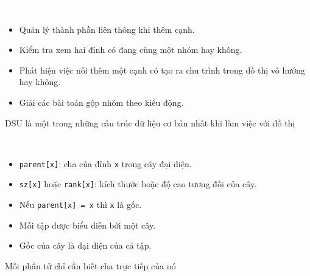 \documentclass{beamer}
\newcommand{\hlblue}[1]{\textcolor{myblue}{#1}}
\newcommand{\hlgreen}[1]{\textcolor{mygreen}{#1}}
\newcommand{\hlred}[1]{\textcolor{myred}{#1}}
\newcommand{\hlorange}[1]{\textcolor{myorange}{#1}}
\newcommand{\hlwhite}[1]{\textcolor{white}{#1}}
\begin{document}
\begin{frame}{\hlwhite{DSU dùng để làm gì?}}
\begin{itemize}
  \item Quản lý \hlblue{thành phần liên thông} khi thêm cạnh.
  \item Kiểm tra xem hai đỉnh có đang cùng một nhóm hay không.
  \item Phát hiện việc nối thêm một cạnh có tạo ra chu trình trong đồ thị vô hướng hay không.
  \item Giải các bài toán gộp nhóm theo kiểu động.
\end{itemize}

\pause

\begin{tcolorbox}
\centering
\hlred{DSU là một trong những cấu trúc dữ liệu cơ bản nhất khi làm việc với đồ thị}
\end{tcolorbox}
\end{frame}


\begin{frame}{\hlwhite{Cấu trúc lưu trữ trong DSU}}
\begin{tcolorbox}[title=\textbf{\hlgreen{Hai mảng quan trọng}}]
\begin{itemize}
  \item \hlblue{\texttt{parent[x]}}: cha của đỉnh \texttt{x} trong cây đại diện.
  \item \hlblue{\texttt{sz[x]}} hoặc \hlblue{\texttt{rank[x]}}: kích thước hoặc độ cao tương đối của cây.
\end{itemize}
\end{tcolorbox}

\begin{itemize}
  \item Nếu \hlred{\texttt{parent[x] = x}} thì \texttt{x} là \hlred{gốc}.
  \item Mỗi tập được biểu diễn bởi một cây.
  \item Gốc của cây là đại diện của cả tập.
\end{itemize}

\pause

\begin{tcolorbox}
\centering
\hlorange{Mỗi phần tử chỉ cần biết cha trực tiếp của nó}
\end{tcolorbox}
\end{frame}

\end{document}
